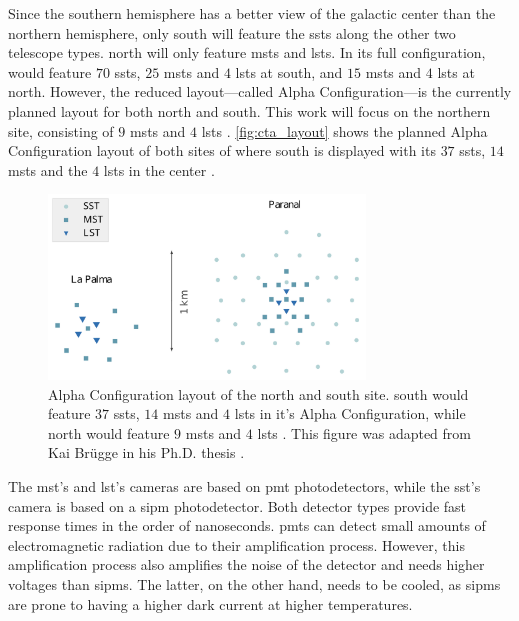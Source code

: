Since the southern hemisphere has a better view of the galactic center than the northern hemisphere,
only \cta{} south will feature the \glspl{sst} along the other two telescope types. \cta{} north
will only feature \glspl{mst} and \glspl{lst}. In its full configuration, \cta{} would feature
\(\num{70}\) \glspl{sst}, \(\num{25}\) \glspl{mst} and \(\num{4}\) \glspl{lst} at \cta{} south,
and \(\num{15}\) \glspl{mst} and \(\num{4}\) \glspl{lst} at \cta{} north. However, the reduced
layout---called Alpha Configuration---is the currently planned layout for both \cta{}
north and south. This work will focus on the northern site, consisting of \(\num{9}\) \glspl{mst}
and \(\num{4}\) \glspl{lst} \cite{cta_north_layout}. \autoref{fig:cta_layout} shows the planned
Alpha Configuration layout of both sites of \cta{} where \cta{} south is displayed with its
\(\num{37}\) \glspl{sst}, \(\num{14}\) \glspl{mst} and the \(\num{4}\) \glspl{lst} in the center
\cite{cta_south_layout}.
\begin{figure}
    \centering
    \includegraphics[width=0.75\textwidth]{graphics/cta_layout.pdf}
    \caption{Alpha Configuration layout of the \cta{} north and \cta{}
    south site. \cta{} south would feature \(\num{37}\) \glspl{sst}, \(\num{14}\) \glspl{mst} and
    \(\num{4}\) \glspl{lst} \cite{cta_south_layout} in it's Alpha Configuration, while \cta{} north would
    feature \(\num{9}\) \glspl{mst} and \(\num{4}\) \glspl{lst} \cite{cta_north_layout}.
    This figure was adapted from Kai Br\"ugge in his Ph.D. thesis \cite{bruegge_thesis}.}
    \label{fig:cta_layout}
\end{figure}

The \gls{mst}'s and \gls{lst}'s cameras are based on \gls{pmt} photodetectors, while the \gls{sst}'s
camera is based on a \gls{sipm} photodetector. Both detector types provide fast response times in the
order of nanoseconds. \glspl{pmt} can detect small amounts of electromagnetic radiation due to their
amplification process. However, this amplification process also amplifies the noise of the detector
and needs higher voltages than \glspl{sipm}. The latter, on the other hand, needs to be cooled,
as \glspl{sipm} are prone to having a higher dark current at higher temperatures.

